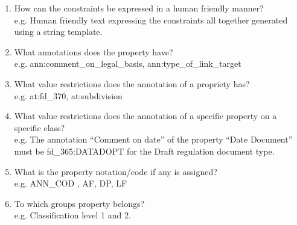 \begin{enumerate}
\item
  How can the constraints be expressed in a human friendly manner?\\e.g. Human friendly text expressing the constraints all together generated using a string template.
\item
  What annotations does the property have?\\e.g.
  ann:comment\_on\_legal\_basis, ann:type\_of\_link\_target
\item
  What value restrictions does the annotation of a propriety has?\\e.g. at:fd\_370, at:subdivision
\item
  What value restrictions does the annotation of a specific property on a specific class?\\e.g. The annotation ``Comment on date'' of the property ``Date Document'' must be fd\_365:DATADOPT for the Draft regulation document type.
\item
  What is the property notation/code if any is assigned?\\e.g. ANN\_COD , AF, DP, LF
\item
  To which groups property belongs?\\e.g. Classification level 1 and 2.
\end{enumerate}

